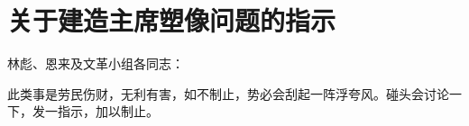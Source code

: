 \section[关于建造主席塑像问题的指示（一九六七年七月五日）]{关于建造主席塑像问题的指示}


林彪、恩来及文革小组各同志：

此类事是劳民伤财，无利有害，如不制止，势必会刮起一阵浮夸风。碰头会讨论一下，发一指示，加以制止。


